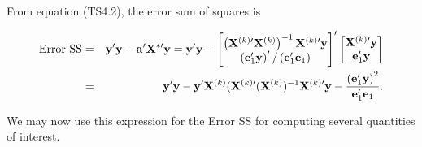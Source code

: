 From equation (TS4.2), the error sum of squares is

\begin{center}
\begin{eqnarray} \label{E5:OVErrorSS}
\text{Error SS} &=&\mathbf{y}^{\prime}\mathbf{y}-\mathbf{a}^{\prime}%
\mathbf{X}^{\mathbf{\ast }\prime }\mathbf{y}=\mathbf{y}^{\prime}\mathbf{y}-%
\begin{bmatrix} \notag
\left( \mathbf{X}^{(k)\prime }\mathbf{X}^{(k)}\right) ^{-1}\mathbf{X}%
^{(k)\prime }\mathbf{y} \\
\left( \mathbf{e}_1^{\prime}\mathbf{y}\right) ^{\prime}/\left(
\mathbf{e}_1^{\prime}\mathbf{e}_1\right)
\end{bmatrix}%
^{\prime}%
\begin{bmatrix} \notag
\mathbf{X}^{(k)\prime }\mathbf{y} \\
\mathbf{e}_1^{\prime}\mathbf{y}%
\end{bmatrix}
\\
&=&\mathbf{y}^{\prime}\mathbf{y}-\mathbf{y}^{\prime}\mathbf{X}^{(k)}(%
\mathbf{X}^{(k)\prime }(\mathbf{X}^{(k)})^{-1}\mathbf{X}^{(k)\prime }\mathbf{%
y}-\frac{\left( \mathbf{e}_1^{\prime}\mathbf{y}\right) ^2}{%
\mathbf{e}_1^{\prime}\mathbf{e}_1}.
\end{eqnarray}
\end{center}

We may now use this expression for the Error SS for computing
several quantities of interest.

